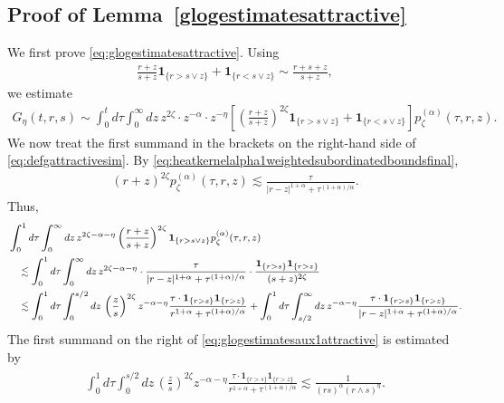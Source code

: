 \documentclass[12pt,reqno]{amsart}
\theoremstyle{definition}
\theoremstyle{remark}
\numberwithin{equation}{section}
\newcommand{\1}{\mathbbm{1}}
\newcommand{\one}{\mathbf{1}}
\begin{document}
\subsection{Proof of Lemma~\ref{glogestimatesattractive}}

We first prove \eqref{eq:glogestimatesattractive}.
Using
\begin{align}
  \label{eq:deffaux}
  \frac{r+z}{s+z} \one_{\{r>s\vee z\}} + \one_{\{r<s\vee z\}}
  \sim \frac{r+s+z}{s+z},
\end{align}
we estimate
\begin{align}
  \label{eq:defgattractivesim}
  G_\eta(t,r,s) \sim \int_0^t d\tau \int_0^\infty dz\, z^{2\zeta} \cdot z^{-\alpha} \cdot z^{-\eta} \left[\left(\frac{r+z}{s+z}\right)^{2\zeta}\one_{\{r>s\vee z\}} + \one_{\{r<s\vee z\}}\right] p_\zeta^{(\alpha)}(\tau,r,z).
\end{align}
We now treat the first summand in the brackets on the right-hand side of \eqref{eq:defgattractivesim}. By \eqref{eq:heatkernelalpha1weightedsubordinatedboundsfinal},
\begin{align}
  (r+z)^{2\zeta} p_\zeta^{(\alpha)}(\tau,r,z)
  \lesssim \frac{\tau}{|r-z|^{1+\alpha} + \tau^{(1+\alpha)/\alpha}}.
\end{align}
Thus,
\begin{align}
  \label{eq:glogestimatesaux1attractive}
  \footnotesize
  \begin{split}
    & \int_0^1 d\tau \int_0^\infty dz\, z^{2\zeta-\alpha-\eta}\left(\frac{r+z}{s+z}\right)^{2\zeta}\one_{\{r>s\vee z\}} p_\zeta^{(\alpha)}(\tau,r,z) \\
    & \quad \lesssim \int_0^1 d\tau \int_0^\infty dz\, z^{2\zeta-\alpha-\eta} \cdot \frac{\tau}{|r-z|^{1+\alpha}+\tau^{(1+\alpha)/\alpha}} \cdot \frac{\one_{\{r>s\}}\one_{\{r>z\}}}{(s+z)^{2\zeta}} \\
    & \quad \lesssim \int_0^1 d\tau \int_0^{s/2}dz\, \left(\frac{z}{s}\right)^{2\zeta} z^{-\alpha-\eta} \frac{\tau\cdot \one_{\{r>s\}}\one_{\{r>z\}}}{r^{1+\alpha}+\tau^{(1+\alpha)/\alpha}}
      + \int_0^1 d\tau \int_{s/2}^\infty dz\, z^{-\alpha-\eta} \frac{\tau\cdot \one_{\{r>s\}}\one_{\{r>z\}}}{|r-z|^{1+\alpha}+\tau^{(1+\alpha)/\alpha}}.
  \end{split}
\end{align}
The first summand on the right of \eqref{eq:glogestimatesaux1attractive} is estimated by
\begin{align}
  \begin{split}
    \int_0^1 d\tau \int_0^{s/2}dz\, \left(\frac{z}{s}\right)^{2\zeta} z^{-\alpha-\eta} \frac{\tau\cdot \one_{\{r>s\}}\one_{\{r>z\}}}{r^{1+\alpha}+\tau^{(1+\alpha)/\alpha}}
    \lesssim \frac{1}{(rs)^{\alpha}(r\wedge s)^{\eta}}.
  \end{split}
\end{align}
\end{document}
